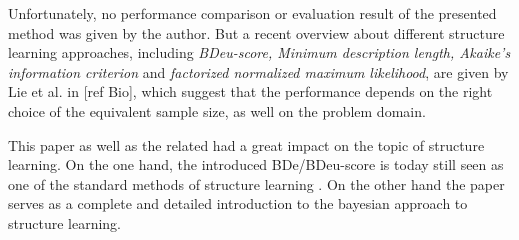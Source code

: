 \documentclass{article}
\begin{document}
Unfortunately, no performance comparison or evaluation result of the presented method was given
by the author. But a recent overview about different structure learning approaches,
including \textit{BDeu-score, Minimum description length, Akaike's information criterion} and \textit{factorized normalized maximum likelihood}, are given by Lie et al. in [ref Bio], which
suggest that the performance depends on the right choice of the equivalent sample size, as well
on the problem domain.

This paper \cite{original} as well as the related \cite{hcg} had a great impact on the topic of structure learning.
On the one hand, the introduced BDe/BDeu-score is today still seen as one of the standard methods of
structure learning \cite{Bio}. On the other hand the paper serves as a complete and detailed introduction
to the bayesian approach to structure learning.





\end{document}
